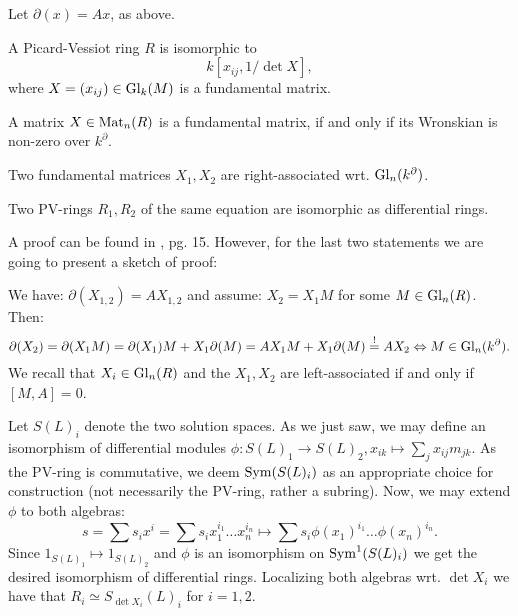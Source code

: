 \begin{prop}\label{PicardVessiotRing}
Let $\partial(x) = A x$, as above.
\bn
\item A Picard-Vessiot ring $R$ is isomorphic to
$$k[x_{ij},1/\det X],$$
where $X = (x_{ij}) \in \mathrm{Gl}_k(M)$ is a fundamental matrix.
\item A matrix $X \in \mathrm{Mat}_n(R)$ is a fundamental matrix, if and only if its Wronskian is non-zero over $k^\partial$.
\item \label{PVLemma3}Two fundamental matrices $X_1, X_2$ are right-associated wrt. $\mathrm{Gl}_n(k^\partial)$.
\item \label{PVLemma4}Two PV-rings $R_1, R_2$ of the same equation are isomorphic as differential rings.
\en
\end{prop}
\bws A proof can be found in \cite{vdPS01}, pg. 15. However, for the last two statements we are going to present a sketch of proof:
\bd
\item[ad \ref{PVLemma3}] We have: $\partial(X_{1,2}) = A X_{1,2}$ and assume: $X_2 = X_1 M$ for some $M \in \mathrm{Gl}_n(R)$. Then:
$$\partial(X_2) = \partial(X_1 M) = \partial(X_1) M + X_1\partial(M) = A X_1 M + X_1 \partial(M) \stackrel{!}{=} A X_2 \Leftrightarrow M \in \mathrm{Gl}_n(k^\partial).$$
We recall that $X_i \in \mathrm{Gl}_n(R)$ and the $X_1, X_2$ are left-associated if and only if $[M, A] = 0$.
\item[ad \ref{PVLemma4}] Let $S(L)_i$ denote the two solution spaces. As we just saw, we may define an isomorphism of differential modules $\phi : S(L)_1 \longrightarrow S(L)_2, x_{ik} \longmapsto \sum_{j} x_{ij} m_{jk}$. As the PV-ring is commutative, we deem $\mathrm{Sym}(S(L)_i)$ as an appropriate choice for construction (not necessarily the PV-ring, rather a subring). Now, we may extend $\phi$ to both algebras:
$$s = \sum s_i x^i = \sum s_i x_1^{i_1} \ldots x_{n}^{i_n} \longmapsto \sum s_i \phi(x_1)^{i_1} \ldots \phi(x_n)^{i_n}.$$
Since $1_{S(L)_1} \longmapsto 1_{S(L)_2}$ and $\phi$ is an isomorphism on $\mathrm{Sym}^1(S(L)_i)$ we get the desired isomorphism of differential rings. Localizing both algebras wrt. $\det X_i$ we have that $R_i \simeq S_{\det X_i} (L)_i$ for $i = 1,2$.
